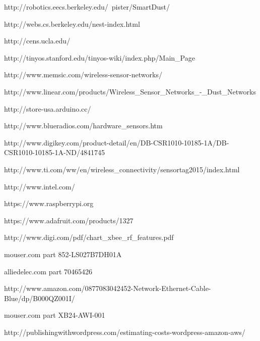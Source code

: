 \documentclass[ppfs.tex]{template/subfiles}
\begin{document}
\begin{thebibliography}{10}

http://robotics.eecs.berkeley.edu/~pister/SmartDust/

http://webs.cs.berkeley.edu/nest-index.html

http://cens.ucla.edu/

http://tinyos.stanford.edu/tinyos-wiki/index.php/Main\_Page

http://www.memsic.com/wireless-sensor-networks/

http://www.linear.com/products/Wireless\_Sensor\_Networks\_-\_Dust\_Networks

http://store-usa.arduino.cc/

http://www.blueradios.com/hardware\_sensors.htm

http://www.digikey.com/product-detail/en/DB-CSR1010-10185-1A/DB-CSR1010-10185-1A-ND/4841745

http://www.ti.com/ww/en/wireless\_connectivity/sensortag2015/index.html

http://www.intel.com/

https://www.raspberrypi.org

https://www.adafruit.com/products/1327

http://www.digi.com/pdf/chart\_xbee\_rf\_features.pdf

mouser.com part 852-LS027B7DH01A

alliedelec.com part 70465426 

http://www.amazon.com/0877083042452-Network-Ethernet-Cable-Blue/dp/B000QZ001I/

mouser.com part XB24-AWI-001

http://publishingwithwordpress.com/estimating-costs-wordpress-amazon-aws/
\end{thebibliography}
\end{document}
